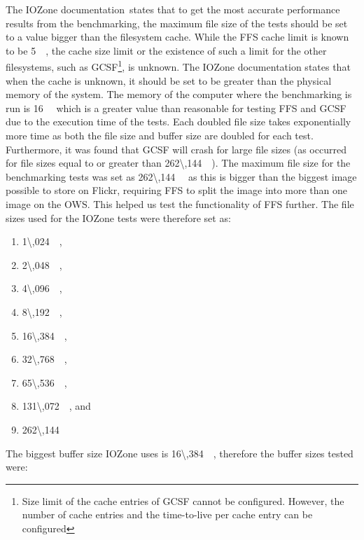 The IOZone documentation\,\cite{iozoneIozoneFilesystemBenchmark} states that to get the most accurate performance results from the benchmarking, the maximum file size of the tests should be set to a value bigger than the filesystem cache. While the \gls{FFS} cache limit is known to be \SI{5}{\mega\byte}, the cache size limit or the existence of such a limit for the other filesystems, such as \gls{GCSF}\footnote{Size limit of the cache entries of \gls{GCSF} cannot be configured. However, the number of cache entries and the \mbox{time-to-live} per cache entry can be configured}, is unknown. The IOZone documentation states that when the cache is unknown, it should be set to be greater than the physical memory of the system. The memory of the computer where the benchmarking is run is \SI{16}{\giga\byte} which is a greater value than reasonable for testing \gls{FFS} and \gls{GCSF} due to the execution time of the tests. Each doubled file size takes exponentially more time as both the file size and buffer size are doubled for each test. Furthermore, it was found that \gls{GCSF} will crash for large file sizes (as occurred for file sizes equal to or greater than \SI[per-mode = symbol]{262\,144}{\kilo\byte}). The maximum file size for the benchmarking tests was set as \SI{262\,144}{\kilo\byte} as this is bigger than the biggest image possible to store on Flickr, requiring \gls{FFS} to split the image into more than one image on the \gls{OWS}. This helped us test the functionality of FFS further. The file sizes used for the IOZone tests were therefore set as:
\begin{enumerate}
	\item \SI{1\,024}{\kilo\byte},
	\item \SI{2\,048}{\kilo\byte},
	\item \SI{4\,096}{\kilo\byte},
	\item \SI{8\,192}{\kilo\byte},
	\item \SI{16\,384}{\kilo\byte},
	\item \SI{32\,768}{\kilo\byte},
	\item \SI{65\,536}{\kilo\byte},
	\item \SI{131\,072}{\kilo\byte}, and
	\item \SI{262\,144}{\kilo\byte}
\end{enumerate}
The biggest buffer size IOZone uses is \SI{16\,384}{\kilo\byte}, therefore the buffer sizes tested were:
